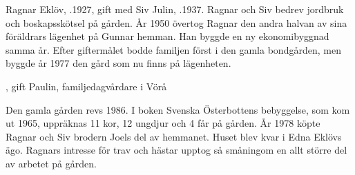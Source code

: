 %
Ragnar Eklöv, .1927, gift med Siv Julin, .1937. Ragnar och Siv bedrev jordbruk och boskapsskötsel på gården. År 1950 övertog Ragnar den andra halvan av sina föräldrars lägenhet på Gunnar hemman. Han byggde en ny ekonomibyggnad samma år. Efter giftermålet bodde familjen först i den gamla bondgården, men byggde år 1977 den gård som nu finns på lägenheten.
\begin{jhchildren}
  \item {}
  \item {}
  \item {}, gift Paulin, familjedagvårdare i Vörå
\end{jhchildren}

Den gamla gården revs 1986. I boken Svenska Österbottens bebyggelse, som  kom ut 1965, uppräknas 11 kor, 12 ungdjur och 4 får på gården. År 1978 köpte Ragnar och Siv brodern Joels del av hemmanet. Huset blev kvar i Edna Eklövs ägo. Ragnars intresse för trav och hästar upptog så småningom en allt större del av arbetet på gården.


